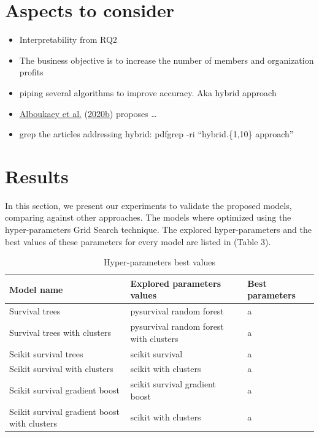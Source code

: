 \documentclass[
  12pt,
]{article}
\providecommand{\tightlist}{%
  \setlength{\itemsep}{0pt}\setlength{\parskip}{0pt}}
\begin{document}
\hypertarget{aspects-to-consider}{%
\section{Aspects to consider}\label{aspects-to-consider}}

\begin{itemize}
\tightlist
\item
  Interpretability from RQ2
\item
  The business objective is to increase the number of members and organization
  profits
\item
  piping several algorithms to improve accuracy. Aka hybrid approach
\item
  \protect\hyperlink{ref-Alboukaey_dynamic_2020}{Alboukaey et al.} (\protect\hyperlink{ref-Alboukaey_dynamic_2020}{2020b}) proposes \ldots{}
\item
  grep the articles addressing hybrid: pdfgrep -ri ``hybrid.\{1,10\} approach''
\end{itemize}

\hypertarget{results}{%
\section{Results}\label{results}}

In this section, we present our experiments to validate the proposed models,
comparing against other approaches. The models where optimized using the
hyper-parameters Grid Search technique. The explored hyper-parameters and the
best values of these parameters for every model are listed in (Table 3).

\begin{table}[ht]
    \footnotesize
    \centering
    \begin{tabular}{p{}p{}p{}}
    \hline
    \textbf{Model name} & \textbf{Explored parameters values} & \textbf{Best parameters} \\
    \hline
    Survival trees  & pysurvival random forest                  & a \\
    Survival trees
    with clusters   & pysurvival random forest with clusters    & a \\
    Scikit survival 
    trees           & scikit survival                           & a \\
    Scikit survival 
    with clusters   & scikit with clusters                      & a \\
    Scikit survival 
    gradient boost  & scikit survival gradient boost            & a \\
    Scikit survival 
    gradient boost 
    with clusters   & scikit with clusters                      & a \\
    \hline
    \end{tabular}
    \caption{Hyper-parameters best values}
    \label{hyperparametersbestvalues}
\end{table}
\end{document}
